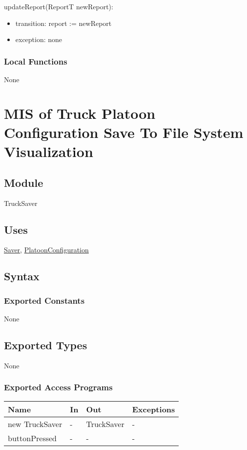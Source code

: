 \documentclass[12pt, titlepage]{article}
\begin{document}
\noindent updateReport(ReportT newReport):
\begin{itemize}
\item transition: report := newReport
\item exception: none
\end{itemize}

\subsubsection{Local Functions}
None
\newpage

\section{MIS of Truck Platoon Configuration Save To File System Visualization} \label{TruckSaver}

\subsection{Module}

TruckSaver

\subsection{Uses}
\hyperref[Saver]{Saver}, \hyperref[PlatoonConfiguration]{PlatoonConfiguration}

\subsection{Syntax}

\subsubsection{Exported Constants}
None
\subsection{Exported Types}
None

\subsubsection{Exported Access Programs}
\begin{center}
\begin{tabular}{p{5cm} p{2cm} p{4cm} p{5.5cm}}
\hline
\textbf{Name} & \textbf{In} & \textbf{Out} & \textbf{Exceptions} \\
\hline
new TruckSaver & - & TruckSaver & - \\
\hline
buttonPressed & - & - & - \\
\hline
\end{tabular}
\end{center}
\end{document}
